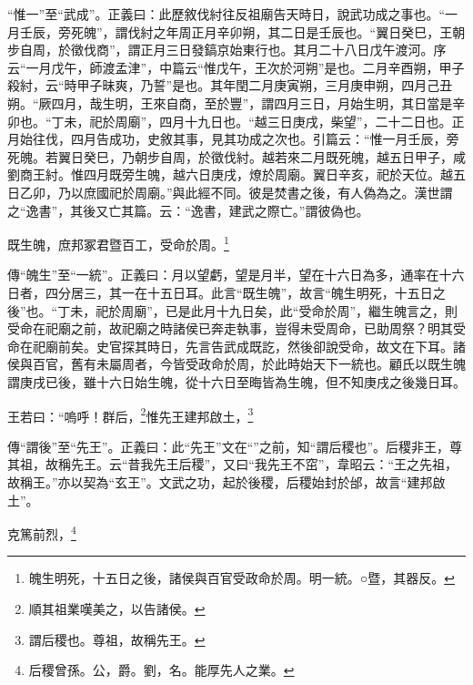 {\noindent\shu{}\fzkt “惟一”至“武成”。正義曰：此歷敘伐紂往反祖廟告天時日，說武功成之事也。“一月壬辰，旁死魄”，謂伐紂之年周正月辛卯朔，其二日是壬辰也。“翼日癸巳，王朝步自周，於徵伐商”，謂正月三日發鎬京始東行也。其月二十八日戊午渡河。序云“一月戊午，師渡孟津”，中篇云“惟戊午，王次於河朔”是也。二月辛酉朔，甲子殺紂，云“時甲子昧爽，乃誓”是也。其年閏二月庚寅朔，三月庚申朔，四月己丑朔。“厥四月，哉生明，王來自商，至於豐”，謂四月三日，月始生明，其日當是辛卯也。“丁未，祀於周廟”，四月十九日也。“越三日庚戌，柴望”，二十二日也。正月始往伐，四月告成功，史敘其事，見其功成之次也。引篇云：“惟一月壬辰，旁死魄。若翼日癸巳，乃朝步自周，於徵伐紂。越若來二月既死魄，越五日甲子，咸劉商王紂。惟四月既旁生魄，越六日庚戌，燎於周廟。翼日辛亥，祀於天位。越五日乙卯，乃以庶國祀於周廟。”與此經不同。彼是焚書之後，有人偽為之。漢世謂之“逸書”，其後又亡其篇。云：“逸書，建武之際亡。”謂彼偽也。 \par}

既生魄，庶邦冢君暨百工，受命於周。\footnote{魄生明死，十五日之後，諸侯與百官受政命於周。明一統。○暨，其器反。}

{\noindent\zhuan{}\fzbyks 傳“魄生”至“一統”。正義曰：月以望虧，望是月半，望在十六日為多，通率在十六日者，四分居三，其一在十五日耳。此言“既生魄”，故言“魄生明死，十五日之後”也。“丁未，祀於周廟”，已是此月十九日矣，此“受命於周”，繼生魄言之，則受命在祀廟之前，故祀廟之時諸侯已奔走執事，豈得未受周命，已助周祭？明其受命在祀廟前矣。史官探其時日，先言告武成既訖，然後卻說受命，故文在下耳。諸侯與百官，舊有未屬周者，今皆受政命於周，於此時始天下一統也。顧氏以既生魄謂庚戌已後，雖十六日始生魄，從十六日至晦皆為生魄，但不知庚戌之後幾日耳。 \par}

王若曰：“嗚呼！群后，\footnote{順其祖業嘆美之，以告諸侯。}惟先王建邦啟土，\footnote{謂后稷也。尊祖，故稱先王。}

{\noindent\zhuan{}\fzbyks 傳“謂後”至“先王”。正義曰：此“先王”文在“”之前，知“謂后稷也”。后稷非王，尊其祖，故稱先王。云“昔我先王后稷”，又曰“我先王不窋”，韋昭云：“王之先祖，故稱王。”亦以契為“玄王”。文武之功，起於後稷，后稷始封於邰，故言“建邦啟土”。 \par}

克篤前烈，\footnote{后稷曾孫。公，爵。劉，名。能厚先人之業。}

